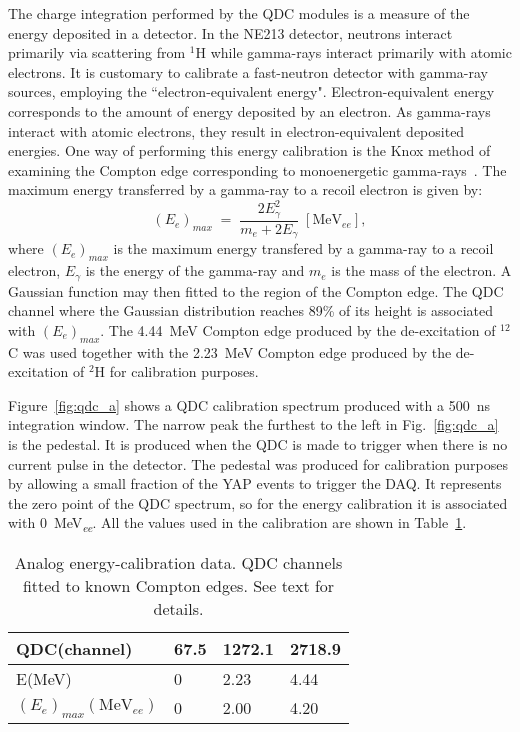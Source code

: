\documentclass[main.tex]{subfiles}
\begin{document}
The charge integration performed by the QDC modules is a measure of the energy deposited in a detector. In the NE213 detector, neutrons interact primarily via scattering from $^1$H while gamma-rays interact primarily with atomic electrons. It is customary to calibrate a fast-neutron detector with gamma-ray sources, employing the ``electron-equivalent energy". Electron-equivalent energy corresponds to the amount of energy deposited by an electron. As gamma-rays interact with atomic electrons, they result in electron-equivalent deposited energies. One way of performing this energy calibration is the Knox method of examining the Compton edge corresponding to monoenergetic gamma-rays~\cite{Nilsson}. The maximum energy transferred by a gamma-ray to a recoil electron is given by:
\begin{equation}
	(E_{e})_{max}\;=\;\frac{2E_{\gamma}^2}{m_e + 2E_\gamma} \;[\textrm{MeV}_{ee}],
\end{equation}
where $(E_e)_{max}$ is the maximum energy transfered by a gamma-ray to a recoil electron, $E_\gamma$ is the energy of the gamma-ray and $m_e$ is the mass of the electron.
A Gaussian function may then fitted to the region of the Compton edge. The QDC channel where the Gaussian distribution reaches 89\% of its height is associated with $(E_e)_{max}$. The \SI{4.44}{MeV} Compton edge produced by the de-excitation of $^{12}$C was used together with the \SI{2.23}{MeV} Compton edge produced by the de-excitation of $^2$H for calibration purposes.

Figure~\ref{fig:qdc_a} shows a QDC calibration spectrum produced with a \SI{500}{ns} integration window. The narrow peak the furthest to the left in Fig.~\ref{fig:qdc_a} is the pedestal. It is produced when the QDC is made to trigger when there is no current pulse in the detector. The pedestal was produced for calibration purposes by allowing a small fraction of the YAP events to trigger the DAQ. It represents the zero point of the QDC spectrum, so for the energy calibration it is associated with \SI{0}{MeV_{\textit{ee}}}. All the values used in the calibration are shown in Table~\ref{tab:knox_a}.

\begin{table}[hb]
	\center
	\begin{tabular}{|l|l|l|l|}
	\hline
	QDC(channel)             & 67.5 & 1272.1 & 2718.9 \\
	\hline \hhline{|=|=|=|=|}
	E(MeV)          & 0    & 2.23  & 4.44 \\
	\hline
	$(E_{e})_{max}(\textrm{MeV}_{ee})$ & 0    & 2.00  & 4.20 \\
	\hline
	\end{tabular}
	\caption[Analog energy-calibration data.]{Analog energy-calibration data. QDC channels fitted to known Compton edges. See text for details.}
	\label{tab:knox_a}
\end{table}
\end{document}
